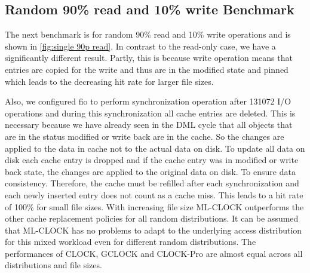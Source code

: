 \documentclass[
	12pt,
	a4paper,
	abstract,
	bibliography=totoc,
	chapterprefix,
	headings=openright,
	numbers=endperiod,
	parskip=half,
	twoside,
]{scrreprt}
\begin{document}
\newpage
\subsection{Random 90\% read and 10\% write Benchmark}

The next benchmark is for random 90\% read and 10\% write operations
and is shown in \cref{fig:single 90p read}.
In contrast to the read-only case, we have a significantly different result.
Partly, this is because write operation means that entries are copied for the write and thus are in the modified state and pinned
which leads to the decreasing hit rate for larger file sizes.

Also, we configured fio to perform synchronization operation after 131072 I/O operations and during this 
synchronization all cache entries are deleted.
This is necessary because we have already seen in the DML cycle that all objects that are in the status 
modified or write back are in the cache.
So the changes are applied to the data in cache not to the actual data on disk.
To update all data on disk each cache entry is dropped and if the cache entry was in modified or write back state,
the changes are applied to the original data on disk.
To ensure data consistency.
Therefore, the cache must be refilled after each synchronization and each newly inserted entry does not count as a cache miss.
This leads to a hit rate of 100\% for small file sizes.
With increasing file size ML-CLOCK outperforms the other cache replacement policies for all random distributions.
It can be assumed that ML-CLOCK has no problems to adapt to the underlying access distribution for this mixed workload 
even for different random distributions.
The performances of CLOCK, GCLOCK and CLOCK-Pro are almost equal across all distributions and file sizes.
\end{document}
